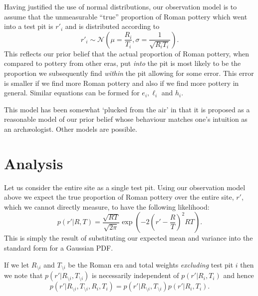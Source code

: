 \documentclass[conference]{IEEEtran}
\begin{document}
Having justified the use of normal distributions, our observation model is to
assume that the unmeasurable ``true'' proportion of Roman pottery which went
into a test pit is $r'_i$ and is distributed according to
\[
    r'_i \sim \mathcal{N}\left(\mu = \frac{R_i}{T_i}, \sigma = \frac{1}{\sqrt{R_i T_i}} \right).
\]
This reflects our prior belief that the actual proportion of Roman pottery, when
compared to pottery from other eras, put \emph{into} the pit is most likely to
be the proportion we subsequently find \emph{within} the pit allowing for some
error. This error is smaller if we find more Roman pottery and also if we find
more pottery in general. Similar equations can be formed for $e_i, \ell_i$ and
$h_i$.

This model has been somewhat `plucked from the air' in that it is proposed as a
reasonable model of our prior belief whose behaviour matches one's intuition as
an arch\ae ologist. Other models are possible.

\section{Analysis}

Let us consider the entire site as a single test pit. Using our observation
model above we expect the true proportion of Roman pottery over the entire site,
$r'$, which we cannot directly measure, to have the following likelihood:
\[
    p(r' | R, T) = \frac{\sqrt{R T}}{\sqrt{2\pi}} \exp \left(
        - 2 \left(r' - \frac{R}{T}\right)^2 R T  \right).
\]
This is simply the result of substituting our expected mean and variance into
the standard form for a Gaussian PDF.

If we let $R_{\setminus i}$ and $T_{\setminus i}$ be the Roman era and total
weights \emph{excluding} test pit $i$ then we note that $p(r' | R_{\setminus
i},T_{\setminus i})$ is necessarily independent of $p(r' | R_i, T_i)$ and hence
\[
    p(r' | R_{\setminus i}, T_{\setminus i}, R_i, T_i) = p(r' | R_{\setminus i},
    T_{\setminus i}) p(r' | R_i, T_i).
\]
\end{document}
